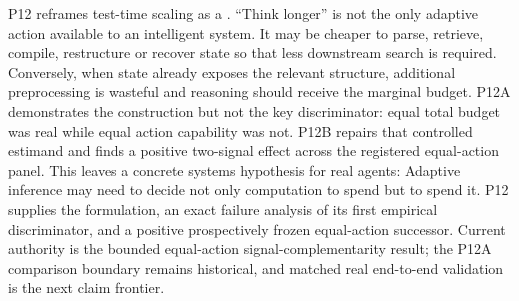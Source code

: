 \markdownRendererDocumentBegin
\markdownRendererSectionBegin
{}\markdownRendererInterblockSeparator
{}P12 reframes test-time scaling as a . “Think longer” is not the only adaptive action available to an intelligent system. It may be cheaper to parse, retrieve, compile, restructure or recover state so that less downstream search is required. Conversely, when state already exposes the relevant structure, additional preprocessing is wasteful and reasoning should receive the marginal budget.\markdownRendererInterblockSeparator
{}P12A demonstrates the construction but not the key discriminator: equal total budget was real while equal action capability was not. P12B repairs that controlled estimand and finds a positive two-signal effect across the registered equal-action panel.\markdownRendererInterblockSeparator
{}This leaves a concrete systems hypothesis for real agents: \markdownRendererInterblockSeparator
{}Adaptive inference may need to decide not only  computation to spend but  to spend it. P12 supplies the formulation, an exact failure analysis of its first empirical discriminator, and a positive prospectively frozen equal-action successor. Current authority is the bounded equal-action signal-complementarity result; the P12A comparison boundary remains historical, and matched real end-to-end validation is the next claim frontier.
\markdownRendererSectionEnd \markdownRendererDocumentEnd